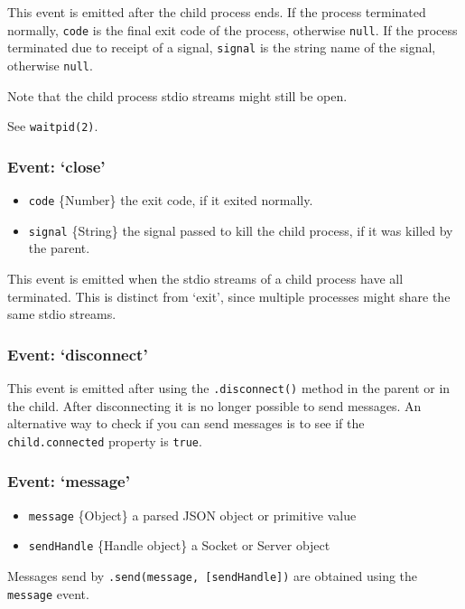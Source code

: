 This event is emitted after the child process ends. If the process
terminated normally, \texttt{code} is the final exit code of the
process, otherwise \texttt{null}. If the process terminated due to
receipt of a signal, \texttt{signal} is the string name of the signal,
otherwise \texttt{null}.

Note that the child process stdio streams might still be open.

See \texttt{waitpid(2)}.

\subsubsection{Event: `close'}

\begin{itemize}
\item
  \texttt{code} \{Number\} the exit code, if it exited normally.
\item
  \texttt{signal} \{String\} the signal passed to kill the child
  process, if it was killed by the parent.
\end{itemize}

This event is emitted when the stdio streams of a child process have all
terminated. This is distinct from `exit', since multiple processes might
share the same stdio streams.

\subsubsection{Event: `disconnect'}

This event is emitted after using the \texttt{.disconnect()} method in
the parent or in the child. After disconnecting it is no longer possible
to send messages. An alternative way to check if you can send messages
is to see if the \texttt{child.connected} property is \texttt{true}.

\subsubsection{Event: `message'}

\begin{itemize}
\item
  \texttt{message} \{Object\} a parsed JSON object or primitive value
\item
  \texttt{sendHandle} \{Handle object\} a Socket or Server object
\end{itemize}

Messages send by \texttt{.send(message, {[}sendHandle{]})} are obtained
using the \texttt{message} event.

